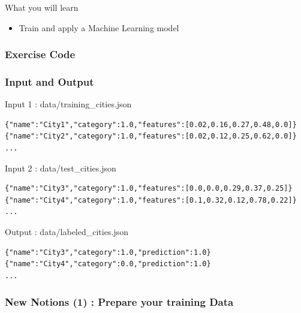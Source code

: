 \documentclass[slidetop,9pt,utf8]{beamer}
\begin{document}
\begin{CJK}{UTF8}{gbsn}
\begin{frame}
  \begin{block}{What you will learn}
    \begin{itemize}
      \item Train and apply a Machine Learning model
    \end{itemize}
  \end{block}

\end{frame}

\begin{frame}
  \frametitle{Exercise Code}

  

\end{frame}

\begin{frame}[fragile]

  \frametitle{Input and Output}
  
  \begin{block}{Input 1 : data/training\_cities.json}
    \begin{verbatim}
{"name":"City1","category":1.0,"features":[0.02,0.16,0.27,0.48,0.0]}
{"name":"City2","category":1.0,"features":[0.02,0.12,0.25,0.62,0.0]}
...
    \end{verbatim}
  \end{block}

  \begin{block}{Input 2 : data/test\_cities.json}
    \begin{verbatim}
{"name":"City3","category":1.0,"features":[0.0,0.0,0.29,0.37,0.25]}
{"name":"City4","category":1.0,"features":[0.1,0.32,0.12,0.78,0.22]}
...
    \end{verbatim}
  \end{block}

  \begin{block}{Output : data/labeled\_cities.json}
    \begin{verbatim}
{"name":"City3","category":1.0,"prediction":1.0}
{"name":"City4","category":0.0,"prediction":1.0}
...
    \end{verbatim}
  \end{block}

\end{frame}

\begin{frame}[fragile]
  \frametitle{New Notions (1) : Prepare your training Data}


\end{frame}
\end{CJK}
\end{document}
